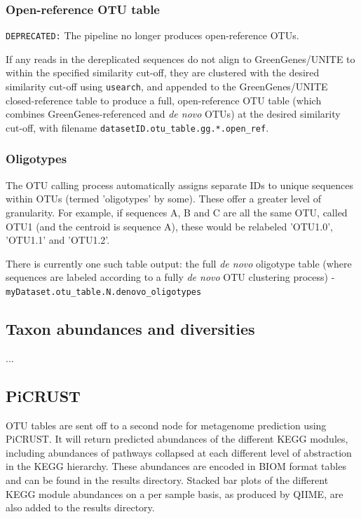 \documentclass[11pt, oneside]{article}   	%
\begin{document}
\subsubsection{Open-reference OTU table}
{\tt DEPRECATED:} The pipeline no longer produces open-reference OTUs. 

If any reads in the dereplicated sequences do not align to GreenGenes/UNITE to within the specified similarity cut-off, they are clustered with the desired similarity cut-off using {\tt usearch}, and appended to the GreenGenes/UNITE closed-reference table to produce a full, open-reference OTU table (which combines GreenGenes-referenced and \textit{de novo} OTUs) at the desired similarity cut-off, with filename {\tt datasetID.otu\_table.gg.*.open\_ref}.

\subsubsection{Oligotypes}
The OTU calling process automatically assigns separate IDs to unique sequences within OTUs (termed 'oligotypes' by some).  These offer a greater level of granularity.  For example, if sequences A, B and C are all the same OTU, called OTU1 (and the centroid is sequence A), these would be relabeled 'OTU1.0', 'OTU1.1' and 'OTU1.2'.

There is currently one such table output: the full \textit{de novo} oligotype table (where sequences are labeled according to a fully \textit{de novo} OTU clustering process) - \\{\tt myDataset.otu\_table.N.denovo\_oligotypes}

\subsection{Taxon abundances and diversities}
...

\subsection{PiCRUST}
OTU tables are sent off to a second node for metagenome prediction using PiCRUST.  It will return predicted abundances of the different KEGG modules, including abundances of pathways collapsed at each different level of abstraction in the KEGG hierarchy.  These abundances are encoded in BIOM format tables and can be found in the results directory.  Stacked bar plots of the different KEGG module abundances on a per sample basis, as produced by QIIME, are also added to the results directory. 
\end{document}

